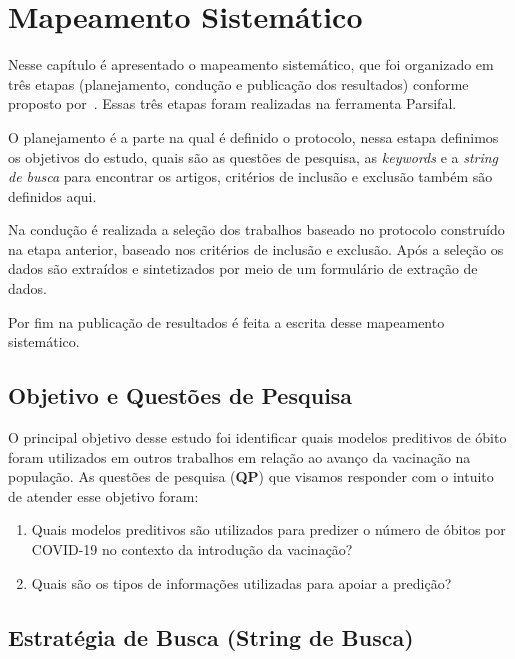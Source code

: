 \chapter{Mapeamento Sistemático}
\label{cap:mapeamento}

Nesse capítulo é apresentado o mapeamento sistemático, que foi organizado em três etapas (planejamento, condução e publicação dos resultados) conforme proposto por~\cite{Fabbri}. Essas três etapas foram realizadas na ferramenta Parsifal\cite{Parsifal}.

O planejamento é a parte na qual é definido o protocolo, nessa estapa definimos os objetivos do estudo, quais são as questões de pesquisa, as \textit{keywords} e a \textit{string de busca} para encontrar os artigos, critérios de inclusão e exclusão também são definidos aqui.

Na condução é realizada a seleção dos trabalhos baseado no protocolo construído na etapa anterior, baseado nos critérios de inclusão e exclusão. Após a seleção os dados são extraídos e sintetizados por meio de um formulário de extração de dados.

Por fim na publicação de resultados é feita a escrita desse mapeamento sistemático.


\section{Objetivo e Questões de Pesquisa}

O principal objetivo desse estudo foi identificar quais modelos preditivos de óbito foram utilizados em outros trabalhos em relação ao avanço da vacinação na população. As questões de pesquisa (\textbf{QP}) que visamos responder com o intuito de atender esse objetivo foram:

\begin{enumerate}
    \item[\textbf{QP1.}] Quais modelos preditivos são utilizados para predizer o número de óbitos por COVID-19 no contexto da introdução da vacinação?
    \item[\textbf{QP2.}] Quais são os tipos de informações utilizadas para apoiar a predição?
\end{enumerate}


\section{Estratégia de Busca (String de Busca)}

